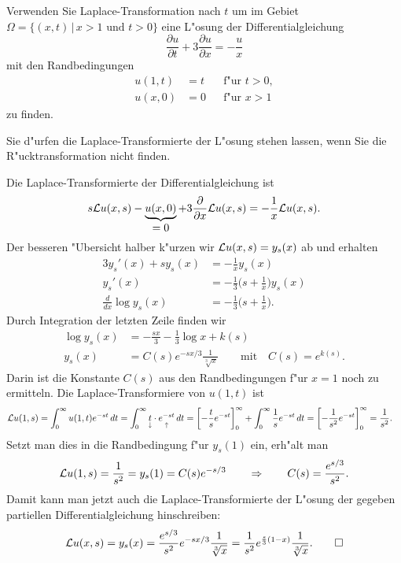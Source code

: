 Verwenden Sie Laplace-Transformation nach $t$ um
im Gebiet $\Omega=\{(x,t)\,|\, x > 1 \text{ und } t > 0\}$ eine
L"osung der Differentialgleichung
\begin{equation}
\frac{\partial u}{\partial t} +3\frac{\partial u}{\partial x} = -\frac{u}{x}
\label{50000012:dgl}
\end{equation}
mit den Randbedingungen
\begin{equation}
\begin{aligned}
u(1,t)&=t& &\text{f"ur $t>0$},\\
u(x,0)&=0& &\text{f"ur $x > 1$}
\end{aligned}
\label{50000012:rb}
\end{equation}
zu finden.

\begin{hinweis}
Sie d"urfen die Laplace-Transformierte der L"osung stehen lassen, wenn Sie
die R"ucktransformation nicht finden.
\end{hinweis}

\begin{loesung}
Die Laplace-Transformierte der Differentialgleichung ist
\[
s{\cal L}u(x,s) - \underbrace{u(x,0)}_{\displaystyle =0}
+ 3\frac{\partial }{\partial x}{\cal L}u(x,s)
=
-\frac1x{\cal L}u(x,s).
\]
Der besseren "Ubersicht halber k"urzen wir ${\cal L}u(x,s)=y_s(x)$ ab
und erhalten
\begin{align*}
3y_s'(x) + sy_s(x) &= -\frac1x y_s(x)
\\
y_s'(x)&=-\frac13\biggl(s+\frac1x\biggr) y_s(x)
\\
\frac{d}{dx} \log y_s(x) &= -\frac13\biggl(s+\frac1x\biggr).
\end{align*}
Durch Integration der letzten Zeile finden wir
\begin{align*}
\log y_s(x) &= -\frac{sx}{3}-\frac13\log x + k(s)
\\
y_s(x) &= C(s) e^{-sx/3}\frac1{\sqrt[3]{x}}\qquad\text{mit}\quad C(s)=e^{k(s)}.
\end{align*}
Darin ist die Konstante $C(s)$ aus den Randbedingungen f"ur $x=1$
noch zu ermitteln.
Die Laplace-Transformiere von $u(1,t)$ ist
\begin{align*}
{\cal L}u(1,s)
&=
\int_0^\infty u(1,t)e^{-st}\,dt
=
\int_0^\infty \underset{\downarrow}{t}\cdot\underset{\uparrow}{e^{-st}}\,dt
=
\biggl[-\frac{t}se^{-st}\biggr]_0^\infty
+\int_0^\infty \frac1s e^{-st}\,dt
=
\biggl[ -\frac1{s^2}e^{-st}\biggr]_0^\infty=\frac1{s^2}.
\end{align*}
Setzt man dies in die Randbedingung f"ur $y_s(1)$ ein, erh"alt man
\[
{\cal L}u(1,s) = \frac1{s^2} = y_s(1)=C(s) e^{-s/3}
\qquad
\Rightarrow
\qquad
C(s) = \frac{e^{s/3}}{s^2}.
\]
Damit kann man jetzt auch die Laplace-Transformierte der L"osung der gegeben
partiellen Differentialgleichung hinschreiben:
\[
{\cal L}u(x,s)
=
y_s(x)
=
\frac{e^{s/3}}{s^2}e^{-sx/3}\frac1{\sqrt[3]{x}}
=
\frac1{s^2}e^{\frac{s}3(1-x)}\frac1{\sqrt[3]{x}}.
\qedhere
\]
\end{loesung}

